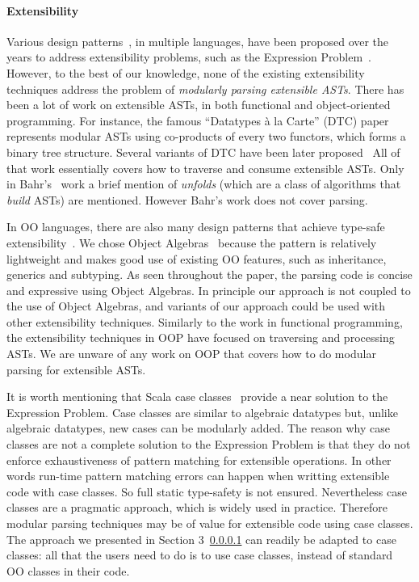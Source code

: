 \paragraph{Extensibility} Various design patterns~\cite{}, in multiple
languages, have been proposed over the years to address extensibility
problems, such as the Expression Problem~\cite{}. However, to the best
of our knowledge, none of the existing extensibility techniques
address the problem of \emph{modularly 
parsing extensible ASTs}.  There has been
a lot of work on extensible ASTs, in both functional and
object-oriented programming.  For instance, the famous ``Datatypes \`a
la Carte'' (DTC)
paper~\cite{swierstra2008} represents modular ASTs using co-products
of every two functors, which forms a binary tree structure. 
Several variants of DTC have been later proposed~\cite{Bahr2011,Bahr2014,Oliveira2015}
All of that work essentially covers how to traverse and 
consume extensible ASTs. 
Only in Bahr's~\cite{Bahr2011} work a brief mention of \emph{unfolds} 
(which are a class of algorithms that \emph{build} ASTs) are mentioned. 
However Bahr's work does not cover parsing.

In OO languages, there are also many design patterns that achieve 
type-safe extensibility~\cite{torgerson,odersky,Oliveira09,Oliveira12,Wang16}. 
We chose Object Algebras~\cite{Oliveira2012} because the pattern is 
relatively lightweight and makes good use of existing OO features,
such as inheritance, generics and subtyping. As seen throughout the paper, 
the parsing code is concise and expressive using Object Algebras.
In principle our approach is not coupled to the use of Object
Algebras, and variants of our approach could be used with other 
extensibility techniques. Similarly to the work in functional
programming, the extensibility techniques in OOP have focused 
on traversing and processing ASTs. We are unware of any work on OOP
that covers how to do modular parsing for extensible ASTs.

It is worth mentioning that Scala case classes~\cite{} provide a near
solution to the Expression Problem. Case classes are similar to
algebraic datatypes but, unlike algebraic datatypes, new cases can be
modularly added. The reason why case classes are not a complete
solution to the Expression Problem is that they do not enforce
exhaustiveness of pattern matching for extensible operations. In other
words run-time pattern matching errors can happen when writting
extensible code with case classes.  So full static type-safety is not
ensured. Nevertheless case classes are a pragmatic approach, which is
widely used in practice. Therefore modular parsing techniques may be
of value for extensible code using case classes.  The approach we
presented in Section 3~\ref{} can readily be adapted to case classes:
all that the users need to do is to use case classes, instead of
standard OO classes in their code.

